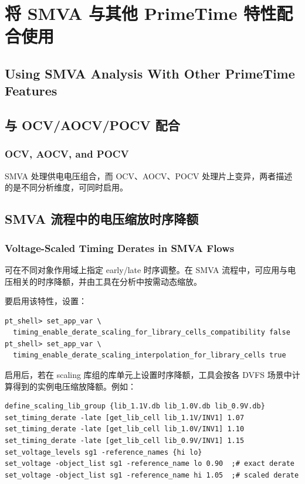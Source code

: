 \section{将 SMVA 与其他 PrimeTime 特性配合使用}
\subsection*{Using SMVA Analysis With Other PrimeTime Features}

\subsection{与 OCV/AOCV/POCV 配合}
\subsubsection*{OCV, AOCV, and POCV}

SMVA 处理供电电压组合，而 OCV、AOCV、POCV 处理片上变异，两者描述的是不同分析维度，可同时启用。

\subsection{SMVA 流程中的电压缩放时序降额}
\subsubsection*{Voltage-Scaled Timing Derates in SMVA Flows}

 可在不同对象作用域上指定 early/late 时序调整。在 SMVA 流程中，可应用与电压相关的时序降额，并由工具在分析中按需动态缩放。

要启用该特性，设置：
\begin{lstlisting}
pt_shell> set_app_var \
  timing_enable_derate_scaling_for_library_cells_compatibility false
pt_shell> set_app_var \
  timing_enable_derate_scaling_interpolation_for_library_cells true
\end{lstlisting}

启用后，若在 scaling 库组的库单元上设置时序降额，工具会按各 DVFS 场景中计算得到的实例电压缩放降额。例如：
\begin{lstlisting}
define_scaling_lib_group {lib_1.1V.db lib_1.0V.db lib_0.9V.db}
set_timing_derate -late [get_lib_cell lib_1.1V/INV1] 1.07
set_timing_derate -late [get_lib_cell lib_1.0V/INV1] 1.10
set_timing_derate -late [get_lib_cell lib_0.9V/INV1] 1.15
set_voltage_levels sg1 -reference_names {hi lo}
set_voltage -object_list sg1 -reference_name lo 0.90  ;# exact derate
set_voltage -object_list sg1 -reference_name hi 1.05  ;# scaled derate
\end{lstlisting}

